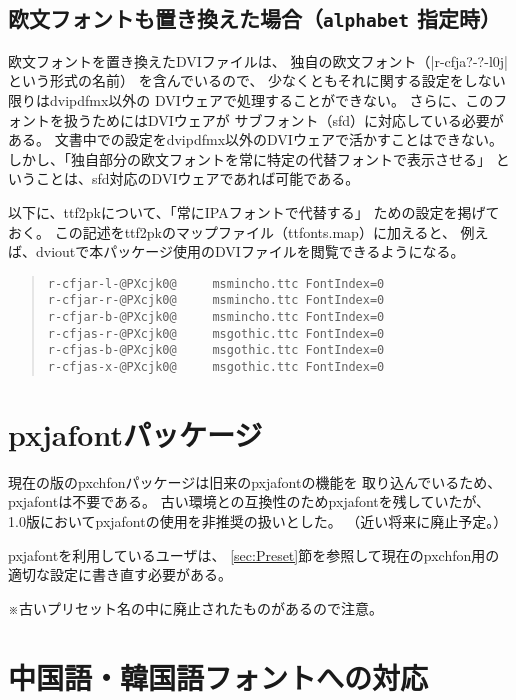 \documentclass[uplatex,dvipdfmx,a4paper]{jsarticle}
\newcommand{\Pkg}[1]{\textsf{#1}}
\newcommand{\Note}{\par\noindent ※}
\begin{document}
\subsection{欧文フォントも置き換えた場合（\texttt{alphabet} 指定時）}

欧文フォントを置き換えたDVIファイルは、
独自の欧文フォント（|r-cfja?-?-l0j| という形式の名前）
を含んでいるので、
少なくともそれに関する設定をしない限りはdvipdfmx以外の
DVIウェアで処理することができない。
さらに、このフォントを扱うためにはDVIウェアが
サブフォント（sfd）に対応している必要がある。
文書中での設定をdvipdfmx以外のDVIウェアで活かすことはできない。
しかし、「独自部分の欧文フォントを常に特定の代替フォントで表示させる」
ということは、sfd対応のDVIウェアであれば可能である。

以下に、ttf2pkについて、「常にIPAフォントで代替する」
ための設定を掲げておく。
この記述をttf2pkのマップファイル（ttfonts.map）に加えると、
例えば、dvioutで本パッケージ使用のDVIファイルを閲覧できるようになる。

\begin{quote}\small\begin{verbatim}
r-cfjar-l-@PXcjk0@     msmincho.ttc FontIndex=0
r-cfjar-r-@PXcjk0@     msmincho.ttc FontIndex=0
r-cfjar-b-@PXcjk0@     msmincho.ttc FontIndex=0
r-cfjas-r-@PXcjk0@     msgothic.ttc FontIndex=0
r-cfjas-b-@PXcjk0@     msgothic.ttc FontIndex=0
r-cfjas-x-@PXcjk0@     msgothic.ttc FontIndex=0
\end{verbatim}\end{quote}

\section{pxjafontパッケージ}

現在の版の\Pkg{pxchfon}パッケージは旧来の\Pkg{pxjafont}の機能を
取り込んでいるため、\Pkg{pxjafont}は不要である。
古い環境との互換性のため\Pkg{pxjafont}を残していたが、
1.0版において\Pkg{pxjafont}の使用を非推奨の扱いとした。
（近い将来に廃止予定。）

\Pkg{pxjafont}を利用しているユーザは、
\ref{sec:Preset}節を参照して現在の\Pkg{pxchfon}用の
適切な設定に書き直す必要がある。

\Note 古いプリセット名の中に廃止されたものがあるので注意。

\section{中国語・韓国語フォントへの対応}
\label{sec:Non-Japanese}
\end{document}

